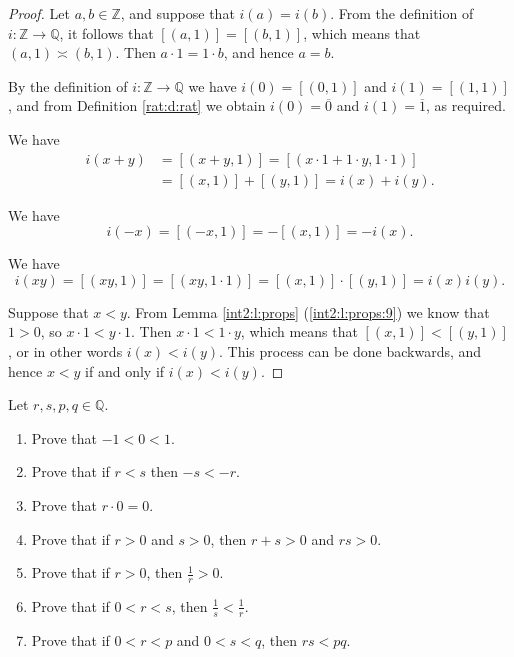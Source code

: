 \begin{proof}
	\hfill

	Let $a, b \in \mathbb{Z}$, and suppose that $i(a) = i(b)$. From the definition of $i: \mathbb{Z} \to \mathbb{Q}$, it follows that $[(a, 1)] = [(b, 1)]$, which means that $(a, 1) \asymp (b, 1)$. Then $a \cdot 1 = 1 \cdot b$, and hence $a = b$.

	By the definition of $i: \mathbb{Z} \to \mathbb{Q}$ we have $i(0) = [(0, 1)]$ and $i(1) = [(1, 1)]$, and from Definition \ref{rat:d:rat} we obtain $i(0) = \overline{0}$ and $i(1) = \overline{1}$, as required.

	We have
	\begin{align*}
		i(x + y) & = [(x + y, 1)] = [(x \cdot 1 + 1 \cdot y, 1 \cdot 1)] \\
		         & = [(x, 1)] + [(y, 1)] = i(x) + i(y).
	\end{align*}

	We have
	\[
		i(-x) = [(-x, 1)] = -[(x, 1)] = -i(x).
	\]

	We have
	\[
		i(xy) = [(xy, 1)] = [(xy, 1 \cdot 1)] = [(x, 1)] \cdot [(y, 1)] = i(x)i(y).
	\]

	Suppose that $x < y$. From Lemma \ref{int2:l:props} (\ref{int2:l:props:9}) we know that $1 > 0$, so ${x \cdot 1 < y \cdot 1}$. Then $x \cdot 1 < 1 \cdot y$, which means that $[(x, 1)] < [(y, 1)]$, or in other words $i(x) < i(y)$. This process can be done backwards, and hence $x < y$ if and only if $i(x) < i(y)$.
\end{proof}


\Newpage

\begin{exercise} %
	\label{rat:e:6}
	Let ${r, s, p, q \in \mathbb{Q}}$.
	\begin{enumerate}
		\item Prove that $-1 < 0 < 1$. \label{rat:e:6:1}
		\item Prove that if $r < s$ then $-s < -r$. \label{rat:e:6:2}
		\item Prove that $r \cdot 0 = 0$. \label{rat:e:6:3}
		\item Prove that if $r > 0$ and $s > 0$, then $r + s > 0$ and $r s > 0$. \label{rat:e:6:4}
		\item Prove that if $r > 0$, then $\frac{1}{r} > 0$. \label{rat:e:6:5}
		\item Prove that if $0 < r < s$, then $\frac{1}{s} < \frac{1}{r}$. \label{rat:e:6:6}
		\item Prove that if $0 < r < p$ and $0 < s < q$, then $r s < p q$. \label{rat:e:6:7}
	\end{enumerate}
\end{exercise}

